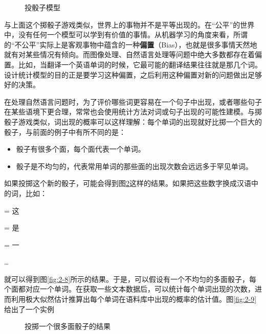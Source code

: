 \begin{figure}[htp]
\centering

\caption{投骰子模型}
\label{fig:2-6}
\end{figure}

\parinterval 与上面这个掷骰子游戏类似，世界上的事物并不是平等出现的。在“公平”的世界中，没有任何一个模型可以学到有价值的事情。从机器学习的角度来看，所谓的“不公平”实际上是客观事物中蕴含的一种{\small\sffamily\bfseries{偏置}}（Bias），也就是很多事情天然地就有对某些情况有倾向。而图像处理、自然语言处理等问题中绝大多数都存在着偏置。比如，当翻译一个英语单词的时候，它最可能的翻译结果往往就是那几个词。设计统计模型的目的正是要学习这种偏置，之后利用这种偏置对新的问题做出足够好的决策。

\parinterval 在处理自然语言问题时，为了评价哪些词更容易在一个句子中出现，或者哪些句子在某些语境下更合理，常常也会使用统计方法对词或句子出现的可能性建模。与掷骰子游戏类似，词出现的概率可以这样理解：每个单词的出现就好比掷一个巨大的骰子，与前面的例子中有所不同的是：

\begin{itemize}
\vspace{0.5em}
\item 骰子有很多个面，每个面代表一个单词。
\vspace{0.5em}
\item 骰子是不均匀的，代表常用单词的那些面的出现次数会远远多于罕见单词。
\vspace{0.5em}
\end{itemize}

\parinterval 如果投掷这个新的骰子，可能会得到图\ref{fig:2-7}这样的结果。如果把这些数字换成汉语中的词，比如：
\vspace{0.5em}

\; = \; 这

\; = \; 是

\; = \; 一

\parinterval  \ldots
\vspace{0.5em}

\parinterval 就可以得到图\ref{fig:2-8}所示的结果。于是，可以假设有一个不均匀的多面骰子，每个面都对应一个单词。在获取一些文本数据后，可以统计每个单词出现的次数，进而利用极大似然估计推算出每个单词在语料库中出现的概率的估计值。图\ref{fig:2-9}给出了一个实例

\begin{figure}[htp]
\centering

\caption{投掷一个很多面骰子的结果}
\label{fig:2-7}
\end{figure}

